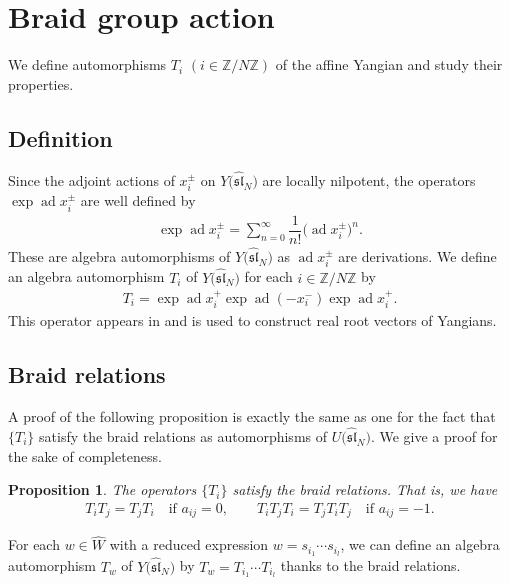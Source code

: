 \documentclass[pdftex]{sigma}
\newtheorem{prop}[thm]{Proposition}
\theoremstyle{definition}
\numberwithin{equation}{section}
\DeclareMathOperator{\ad}{ad}
\newcommand{\bbZ}{\mathbb{Z}}
\newcommand{\affY}{Y\big(\affsl\big)}
\newcommand{\affsl}{\hat{\mathfrak{sl}}_N}
\begin{document}
\section{Braid group action}\label{section3}

We define automorphisms $T_i$ $(i \in \bbZ/N\bbZ)$ of the affine Yangian and study their properties.

\subsection{Definition}

Since the adjoint actions of $x_i^{\pm}$ on $\affY$ are locally nilpotent, the operators $\exp\ad x_i^{\pm}$ are well defined by
\begin{gather*}
\exp\ad x_i^{\pm} = \sum_{n=0}^{\infty} \dfrac{1}{n!} \big(\ad x_i^{\pm}\big)^n.
\end{gather*}
These are algebra automorphisms of $\affY$ as $\ad x_i^{\pm}$ are derivations. We define an algebra automorphism $T_i$ of $\affY$ for each $i \in \bbZ/N\bbZ$ by
\begin{gather*}
T_i = \exp\ad x_i^{+} \exp\ad (-x_i^{-}) \exp\ad x_i^{+}.
\end{gather*}
This operator appears in \cite{MR3861718} and is used to construct real root vectors of Yangians.

\subsection{Braid relations}

A proof of the following proposition is exactly the same as one for the fact that $\{T_i\}$ satisfy the braid relations as automorphisms of $U\big(\affsl\big)$. We give a proof for the sake of completeness.

\begin{prop}\label{prop:braid}The operators $\{T_i\}$ satisfy the braid relations. That is, we have
\begin{gather*}
T_i T_j = T_j T_i \quad \text{if $a_{ij}=0$},\qquad T_i T_j T_i = T_j T_i T_j \quad \text{if $a_{ij}=-1$}.
\end{gather*}
\end{prop}
For each $w \in \hat{W}$ with a reduced expression $w=s_{i_1} \cdots s_{i_l}$, we can define an algebra automorphism $T_w$ of $\affY$ by $T_w = T_{i_1} \cdots T_{i_l}$ thanks to the braid relations.
\end{document}
